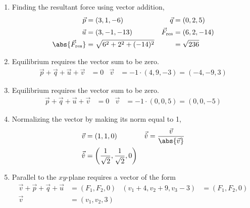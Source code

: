 \begin{enumerate}
    \item Finding the resultant force using vector addition,
          \begin{align}
              \vec{p}                           & = (3, 1, -6)                 &
              \vec{q}                           & = (0, 2, 5)                    \\
              \vec{u}                           & = (3, -1, -13)               &
              \vec{F}_{\text{res}}              & = (6, 2, -14)                  \\
              \abs{ \vec{F}_{\text{res}}} & = \sqrt{6^2 + 2^2 + (-14)^2} &
                                                & = \sqrt{236}
          \end{align}

    \item Equilibrium requires the vector sum to be zero.
          \begin{align}
              \vec{p} + \vec{q} + \vec{u} + \vec{v} & = 0 &
              \vec{v}                               & =
              -1 \cdot (4, 9, -3) = (-4, -9, 3)
          \end{align}

    \item Equilibrium requires the vector sum to be zero.
          \begin{align}
              \vec{p} + \vec{q} + \vec{u} + \vec{v} & = 0 &
              \vec{v}                               & =
              -1 \cdot (0, 0, 5) = (0, 0, -5)
          \end{align}

    \item Normalizing the vector by making its norm equal to 1,
          \begin{align}
              \vec{v}       & = (1, 1, 0)                  &
              \vec{\hat{v}} & =
              \frac{\vec{v}}{\abs{ \vec{v} }}          \\
              \vec{\hat{v}} & = \left( \frac{1}{\sqrt{2}},
              \frac{1}{\sqrt{2}}, 0 \right)
          \end{align}

    \item Parallel to the $ xy $-plane requires a vector of the form
          \begin{align}
              \vec{v} + \vec{p} + \vec{q} + \vec{u} & = (F_1, F_2, 0) &
              (v_1 + 4, v_2 + 9, v_3 - 3)           & = (F_1, F_2, 0)   \\
              \vec{v}                               & = (v_1, v_2, 3)
          \end{align}


\end{enumerate}
